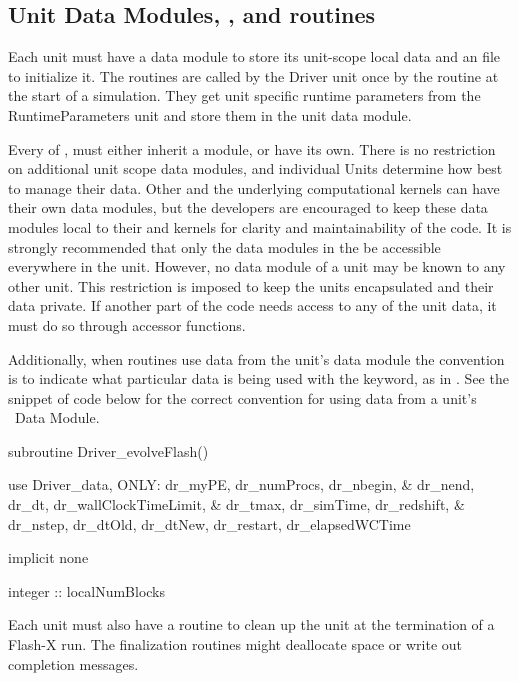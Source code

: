 \subsection{Unit Data Modules, , and  routines}
\label{Sec:Data Modules}

Each unit must have a  data module to store its unit-scope local data
and an  file to initialize it. The 
routines are called by the \unit{Driver} unit once by the routine
 at the start of a simulation.  They get
unit specific runtime parameters from the
\unit{RuntimeParameters} unit and store them in the unit data module. 

Every \uid of , must either inherit a
 module, or have its own. There is no
restriction on additional unit scope data modules, and individual
Units determine how best to manage their data. Other \subunits and the
underlying computational kernels can have their own data modules, but the developers are
encouraged to keep these data modules local to their \subunits and
kernels for clarity and maintainability of the code. It is strongly
recommended that only the data modules in the  \subunit be
accessible everywhere in the unit. However, no data module of a unit
may be known to any other unit. This restriction is imposed to keep
the units encapsulated and their data private. If another part of the
code needs access to any of the unit data, it must do so through
accessor functions. 

Additionally, when routines use data from the unit's data module the
convention is to indicate what particular data is being used with the
 keyword, as in
.  See the snippet of code
below for the correct convention for using data from a unit's \FORTRAN\
Data Module.
\begin{codeseg}
subroutine Driver_evolveFlash()

  use Driver_data, ONLY: dr_myPE, dr_numProcs, dr_nbegin, &
       dr_nend, dr_dt, dr_wallClockTimeLimit, &
       dr_tmax, dr_simTime, dr_redshift, &
       dr_nstep, dr_dtOld, dr_dtNew, dr_restart, dr_elapsedWCTime

  implicit none

  integer   :: localNumBlocks
\end{codeseg}

Each unit must also have a  routine to clean up the
unit at the termination of a Flash-X run.  The finalization routines might deallocate space
or write out completion messages.

